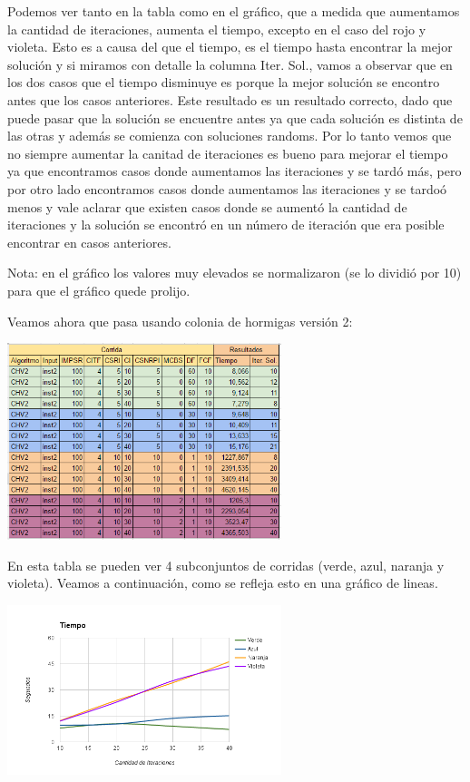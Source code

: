 Podemos ver tanto en la tabla como en el gr\'afico, que a medida que aumentamos la cantidad de iteraciones, aumenta el tiempo, excepto en el caso del rojo y violeta. Esto es a causa del que el tiempo, es el tiempo hasta encontrar la mejor soluci\'on y si miramos con detalle la columna Iter. Sol., vamos a observar que en los dos casos que el tiempo disminuye es porque la mejor soluci\'on se encontro antes que los casos anteriores. Este resultado es un resultado correcto, dado que puede pasar que la soluci\'on se encuentre antes ya que cada soluci\'on es distinta de las otras y adem\'as se comienza con soluciones randoms. 
Por lo tanto vemos que no siempre aumentar la canitad de iteraciones es bueno para mejorar el tiempo ya que encontramos casos donde aumentamos las iteraciones y se tard\'o m\'as, pero por otro lado encontramos casos donde aumentamos las iteraciones y se tardo\'o menos y vale aclarar que existen casos donde se aument\'o la cantidad de iteraciones y la soluci\'on se encontr\'o en un n\'umero de iteraci\'on que era posible encontrar en casos anteriores.

Nota: en el gr\'afico los valores muy elevados se normalizaron (se lo dividi\'o por 10) para que el gr\'afico quede prolijo.

\newpage

Veamos ahora que pasa usando colonia de hormigas versi\'on 2:

\begin{center}
\includegraphics[width=0.6\textwidth]{imagenes/tabla4}
\end{center}

En esta tabla se pueden ver 4 subconjuntos de corridas (verde, azul, naranja y violeta). Veamos a continuaci\'on, como se refleja esto en una gr\'afico de lineas.

\begin{center}
\includegraphics[width=0.6\textwidth]{imagenes/grafico2}
\end{center}

